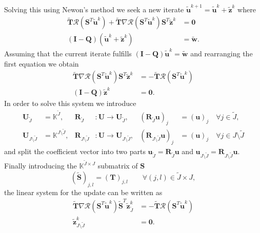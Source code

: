 Solving this using
Newon's method we seek a new iterate $\tilde{\mathbf{u}}^{k+1} =
\tilde{\mathbf{u}}^{k} + \tilde{\mathbf{z}}^{k}$ where
\begin{align*}
\tilde{\mathbf{T}}\mathcal{R}(\mathbf{S}^T\tilde{\mathbf{u}}^k)
 + \tilde{\mathbf{T}}
 \nabla\mathcal{R}(\mathbf{S}^T\tilde{\mathbf{u}}^k)\mathbf{S}^T\tilde{\mathbf{z}}^{k}
 &= \mathbf{0} \\
(\mathbf{I}-\mathbf{Q})(\tilde{\mathbf{u}}^{k} +
 \tilde{\mathbf{z}}^{k}) &= \tilde{\mathbf{w}}  .
\end{align*}
Assuming that the current iterate fulfills
$(\mathbf{I}-\mathbf{Q})\tilde{\mathbf{u}}^k = \tilde{\mathbf{w}}$ and
rearranging the first equation we obtain
\begin{align*}
\tilde{\mathbf{T}}
 \nabla\mathcal{R}(\mathbf{S}^T\tilde{\mathbf{u}}^k)\mathbf{S}^T\tilde{\mathbf{z}}^{k}
 &= - \tilde{\mathbf{T}}\mathcal{R}(\mathbf{S}^T\tilde{\mathbf{u}}^k) \\
(\mathbf{I}-\mathbf{Q}) \tilde{\mathbf{z}}^{k} &= \mathbf{0} .
\end{align*}
In order to solve this system we introduce
\begin{align*}
\mathbf{U}_{\tilde{J}} &= \mathbb{K}^{\tilde{J}}, &
\mathbf{R}_{\tilde{J}}
  &:  \mathbf{U} \to \mathbf{U}_{\tilde{J}}, &
  (\mathbf{R}_{\tilde{J}}\mathbf{u})_j &= (\mathbf{u})_j \quad \forall
j\in\tilde{J},\\ 
\mathbf{U}_{J\setminus\tilde{J}} &= \mathbb{K}^{J\setminus\tilde{J}}, &
\mathbf{R}_{J\setminus\tilde{J}}
  &:  \mathbf{U} \to \mathbf{U}_{J\setminus\tilde{J}}, &
  (\mathbf{R}_{J\setminus\tilde{J}}\mathbf{u})_j &= (\mathbf{u})_j
\quad \forall j\in J\setminus\tilde{J}
\end{align*}
and split the coefficient vector into two parts
$\mathbf{u}_{\tilde{J}} = \mathbf{R}_{\tilde{J}} \mathbf{u}$
and $\mathbf{u}_{J\setminus\tilde{J}} = \mathbf{R}_{J\setminus\tilde{J}} \mathbf{u}$. 
Finally introducing the $\mathbb{K}^{\tilde{J}\times J}$ submatrix of
$\mathbf{S}$
\begin{equation*}
\left(\tilde{\mathbf{S}}\right)_{j,l} = \left(\mathbf{T}\right)_{j,l}
\qquad \forall (j,l) \in \tilde{J}\times J ,
\end{equation*}
the linear system for the update can be written as
\begin{align*}
\tilde{\mathbf{T}}
 \nabla\mathcal{R}(\mathbf{S}^T\tilde{\mathbf{u}}^k)
 \tilde{\mathbf{S}}^T\tilde{\mathbf{z}}^{k}_{\tilde{J}}  
 &= - \tilde{\mathbf{T}}\mathcal{R}(\mathbf{S}^T\tilde{\mathbf{u}}^k) \\
\tilde{\mathbf{z}}^{k}_{J\setminus\tilde{J}} &= \mathbf{0} .
\end{align*}

